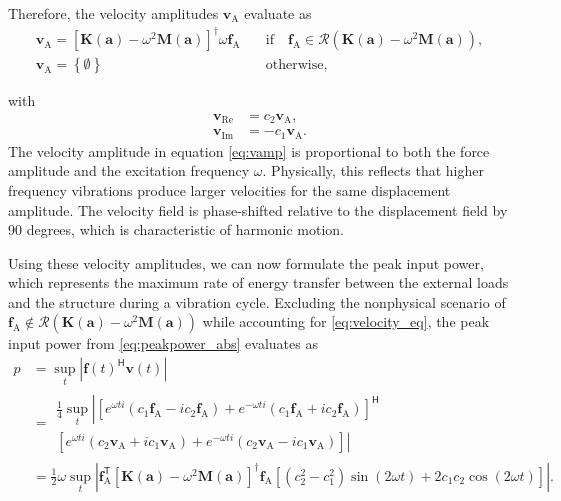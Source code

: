 \documentclass[preprint,3p]{elsarticle}
\newcommand{\T}{^{\mathsf T}}
\newcommand{\TC}{^{\mathsf H}}
\newcommand{\A}{\mathrm{A}}
\newcommand{\Real}{\mathrm{Re}}
\newcommand{\I}{\mathrm{Im}}
\newcommand{\range}[1]{\ensuremath{\mathcal{R}\!\left(#1\right)}}
\numberwithin{equation}{section}
\begin{document}
%
Therefore, the velocity amplitudes $\mathbf{v}_\A$ evaluate as
%
\begin{subequations}\label{eq:vamp}
  \begin{align}
    \mathbf{v}_\A = \left[ \mathbf{K}(\mathbf{a}) - \omega^2 \mathbf{M}(\mathbf{a})\right]^\dagger \omega \mathbf{f}_\A \quad &\text{if} \quad \mathbf{f}_\A \in \range{\mathbf{K}(\mathbf{a}) - \omega^2 \mathbf{M}(\mathbf{a})},\\
    \mathbf{v}_\A = \left\{\emptyset\right\} \quad& \text{otherwise},
  \end{align}
\end{subequations}

with
%
\begin{subequations}
  \begin{align}
    \mathbf{v}_\Real &= c_2 \mathbf{v}_\A,\\
    \mathbf{v}_\I &= -c_1 \mathbf{v}_\A.
  \end{align}
\end{subequations}
%
The velocity amplitude in equation \eqref{eq:vamp} is proportional to both the force amplitude and the excitation frequency $\omega$. Physically, this reflects that higher frequency vibrations produce larger velocities for the same displacement amplitude. The velocity field is phase-shifted relative to the displacement field by 90 degrees, which is characteristic of harmonic motion.

Using these velocity amplitudes, we can now formulate the peak input power, which represents the maximum rate of energy transfer between the external loads and the structure during a vibration cycle. Excluding the nonphysical scenario of $\mathbf{f}_\A \notin \range{\mathbf{K}(\mathbf{a}) - \omega^2 \mathbf{M}(\mathbf{a})}$ while accounting for \eqref{eq:velocity_eq}, the peak input power from \eqref{eq:peakpower_abs} evaluates as
%
\begin{equation}\label{eq:peakpower}
  \begin{aligned}
    p &= \sup_{t} \left\lvert \mathbf{f}(t)\TC \mathbf{v}(t)\right\rvert\\
    &=
    \begin{multlined}
      \frac{1}{4} \sup_{t} \left\lvert\left[e^{\omega t i}(c_1 \mathbf{f}_\A - i c_2 \mathbf{f}_\A) + e^{-\omega t i}( c_1 \mathbf{f}_\A + i c_2 \mathbf{f}_\A)\right]\TC\right.\\
      \left.\left[ e^{\omega t i}(c_2\mathbf{v}_\A + i c_1 \mathbf{v}_\A) + e^{-\omega t i}( c_2 \mathbf{v}_\A - i c_1 \mathbf{v}_\A) \right]\right\rvert
    \end{multlined}\\
    &= \frac{1}{2}\omega \sup_{t} \left\lvert \mathbf{f}_\A\T \left[ \mathbf{K}(\mathbf{a}) - \omega^2 \mathbf{M}(\mathbf{a})\right]^\dagger \mathbf{f}_\A \left[\left(c_2^2-c_1^2\right)\sin(2 \omega t) + 2 c_1 c_2 \cos(2 \omega t)\right]\right\rvert.
  \end{aligned}
\end{equation}
\end{document}
